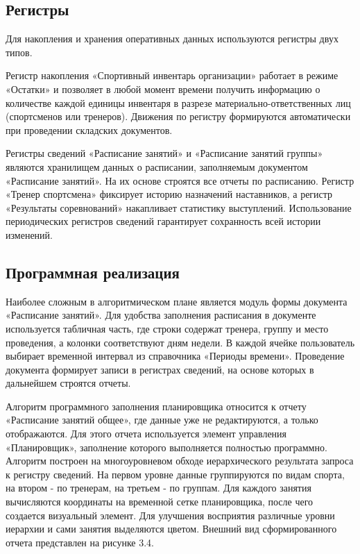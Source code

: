 \subsection{Регистры}

Для накопления и хранения оперативных данных используются регистры двух типов.

Регистр накопления «Спортивный инвентарь организации» работает в режиме «Остатки» и позволяет в любой момент времени получить информацию о количестве каждой единицы инвентаря в разрезе материально-ответственных лиц (спортсменов или тренеров). Движения по регистру формируются автоматически при проведении складских документов.

Регистры сведений «Расписание занятий» и «Расписание занятий группы» являются хранилищем данных о расписании, заполняемым документом «Расписание занятий». На их основе строятся все отчеты по расписанию. Регистр «Тренер спортсмена» фиксирует историю назначений наставников, а регистр «Результаты соревнований» накапливает статистику выступлений. Использование периодических регистров сведений гарантирует сохранность всей истории изменений.

\subsection{Программная реализация}

Наиболее сложным в алгоритмическом плане является модуль формы документа «Расписание занятий». Для удобства заполнения расписания в документе используется табличная часть, где строки содержат тренера, группу и место проведения, а колонки соответствуют дням недели. В каждой ячейке пользователь выбирает временной интервал из справочника «Периоды времени». Проведение документа формирует записи в регистрах сведений, на основе которых в дальнейшем строятся отчеты.

Алгоритм программного заполнения планировщика относится к отчету «Расписание занятий общее», где данные уже не редактируются, а только отображаются. Для этого отчета используется элемент управления «Планировщик», заполнение которого выполняется полностью программно. Алгоритм построен на многоуровневом обходе иерархического результата запроса к регистру сведений. На первом уровне данные группируются по видам спорта, на втором - по тренерам, на третьем - по группам. Для каждого занятия вычисляются координаты на временной сетке планировщика, после чего создается визуальный элемент. Для улучшения восприятия различные уровни иерархии и сами занятия выделяются цветом. Внешний вид сформированного отчета представлен на рисунке 3.4.

